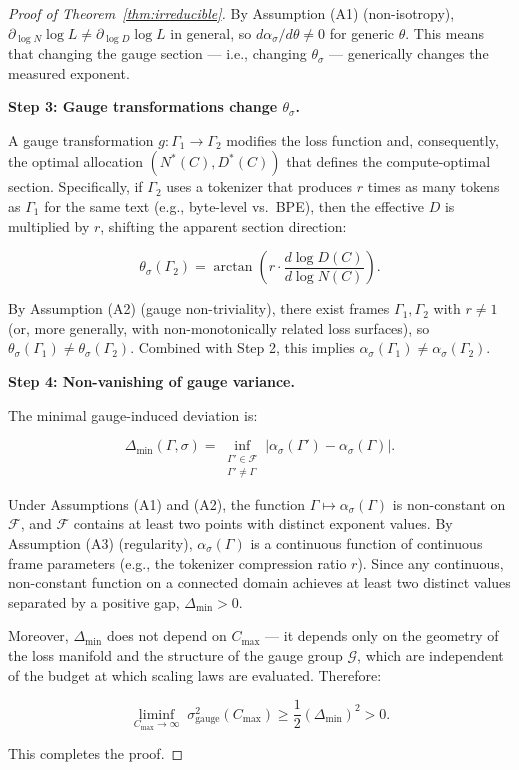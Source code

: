 \documentclass[12pt,a4paper]{article}
\theoremstyle{remark}
\newcommand{\Loss}{L}
\begin{document}
\begin{proof}[Proof of Theorem~\ref{thm:irreducible}]
By Assumption (A1) (non-isotropy), $\partial_{\log N} \log \Loss \neq \partial_{\log D} \log \Loss$ in general, so $d\alpha_\sigma/d\theta \neq 0$ for generic $\theta$. This means that changing the gauge section — i.e., changing $\theta_\sigma$ — generically changes the measured exponent.

\medskip\noindent\textbf{Step 3: Gauge transformations change $\theta_\sigma$.}

A gauge transformation $g: \Gamma_1 \to \Gamma_2$ modifies the loss function and, consequently, the optimal allocation $(N^*(C), D^*(C))$ that defines the compute-optimal section. Specifically, if $\Gamma_2$ uses a tokenizer that produces $r$ times as many tokens as $\Gamma_1$ for the same text (e.g., byte-level vs.\ BPE), then the effective $D$ is multiplied by $r$, shifting the apparent section direction:

\begin{equation}
\theta_{\sigma}(\Gamma_2) = \arctan\left(r \cdot \frac{d\log D(C)}{d\log N(C)}\right).
\label{eq:theta_gauge}
\end{equation}

By Assumption (A2) (gauge non-triviality), there exist frames $\Gamma_1, \Gamma_2$ with $r \neq 1$ (or, more generally, with non-monotonically related loss surfaces), so $\theta_{\sigma}(\Gamma_1) \neq \theta_{\sigma}(\Gamma_2)$. Combined with Step 2, this implies $\alpha_\sigma(\Gamma_1) \neq \alpha_\sigma(\Gamma_2)$.

\medskip\noindent\textbf{Step 4: Non-vanishing of gauge variance.}

The minimal gauge-induced deviation is:

\begin{equation}
\Delta_{\min}(\Gamma, \sigma) = \inf_{\substack{\Gamma' \in \mathcal{F} \\ \Gamma' \neq \Gamma}} |\alpha_\sigma(\Gamma') - \alpha_\sigma(\Gamma)|.
\label{eq:delta_min}
\end{equation}

Under Assumptions (A1) and (A2), the function $\Gamma \mapsto \alpha_\sigma(\Gamma)$ is non-constant on $\mathcal{F}$, and $\mathcal{F}$ contains at least two points with distinct exponent values. By Assumption (A3) (regularity), $\alpha_\sigma(\Gamma)$ is a continuous function of continuous frame parameters (e.g., the tokenizer compression ratio $r$). Since any continuous, non-constant function on a connected domain achieves at least two distinct values separated by a positive gap, $\Delta_{\min} > 0$.

Moreover, $\Delta_{\min}$ does not depend on $C_{\max}$ — it depends only on the geometry of the loss manifold and the structure of the gauge group $\mathcal{G}$, which are independent of the budget at which scaling laws are evaluated. Therefore:

\begin{equation}
\liminf_{C_{\max} \to \infty} \; \sigma^2_{\text{gauge}}(C_{\max}) \geq \frac{1}{2} (\Delta_{\min})^2 > 0.
\label{eq:final_bound}
\end{equation}

This completes the proof.
\end{proof}
\end{document}

